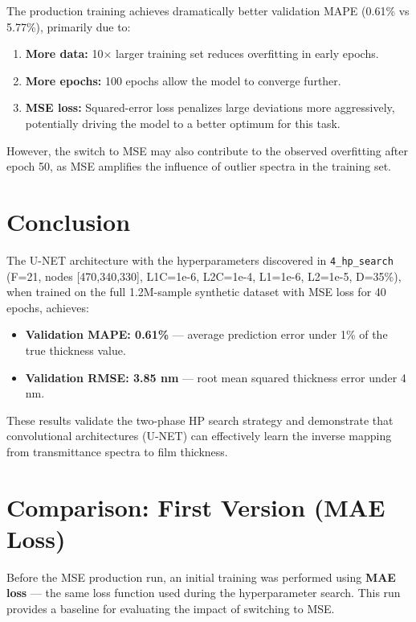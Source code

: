 \documentclass[11pt,a4paper]{article}
\begin{document}
The production training achieves dramatically better validation MAPE (0.61\% vs 5.77\%), primarily due to:
\begin{enumerate}
    \item \textbf{More data:} 10× larger training set reduces overfitting in early epochs.
    \item \textbf{More epochs:} 100 epochs allow the model to converge further.
    \item \textbf{MSE loss:} Squared-error loss penalizes large deviations more aggressively, potentially driving the model to a better optimum for this task.
\end{enumerate}

However, the switch to MSE may also contribute to the observed overfitting after epoch 50, as MSE amplifies the influence of outlier spectra in the training set.

\section{Conclusion}

The U-NET architecture with the hyperparameters discovered in \texttt{4\_hp\_search} (F=21, nodes [470,340,330], L1C=1e-6, L2C=1e-4, L1=1e-6, L2=1e-5, D=35\%), when trained on the full 1.2M-sample synthetic dataset with MSE loss for 40 epochs, achieves:

\begin{itemize}
    \item \textbf{Validation MAPE: 0.61\%} — average prediction error under 1\% of the true thickness value.
    \item \textbf{Validation RMSE: 3.85 nm} — root mean squared thickness error under 4 nm.
\end{itemize}

These results validate the two-phase HP search strategy and demonstrate that convolutional architectures (U-NET) can effectively learn the inverse mapping from transmittance spectra to film thickness.

\section{Comparison: First Version (MAE Loss)}

Before the MSE production run, an initial training was performed using \textbf{MAE loss} — the same loss function used during the hyperparameter search. This run provides a baseline for evaluating the impact of switching to MSE.
\end{document}
